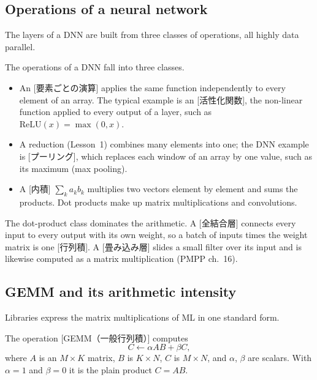 \documentclass[../main.tex]{subfiles}
\begin{document}
\subsection{Operations of a neural network}

The layers of a DNN are built from three classes of operations, all
highly data parallel.

\begin{definition}
  The operations of a DNN fall into three classes.
  \begin{itemize}
    \item An [要素ごとの演算] applies the
      same function independently to every element of an array.  The
      typical example is an [活性化関数], the
      non-linear function applied to every output of a layer, such as
      $\mathrm{ReLU}(x) = \max(0, x)$.
    \item A reduction (Lesson~1) combines many elements into one; the
      DNN example is [プーリング], which replaces each
      window of an array by one value, such as its maximum (max
      pooling).
    \item A [内積] $\sum_k a_k b_k$ multiplies two
      vectors element by element and sums the products.  Dot products
      make up matrix multiplications and convolutions.
  \end{itemize}
\end{definition}

The dot-product class dominates the arithmetic.  A
[全結合層] connects every input to every
output with its own weight, so a batch of inputs times the weight
matrix is one [行列積].  A
[畳み込み層] slides a small filter over its
input and is likewise computed as a matrix multiplication (PMPP
ch.~16).

\subsection{GEMM and its arithmetic intensity}

Libraries express the matrix multiplications of ML in one standard
form.

\begin{definition}[GEMM]
  The operation [GEMM（一般行列積）]
  computes
  \begin{equation}
    C \leftarrow \alpha A B + \beta C ,
    \label{eq:l12-gemm}
  \end{equation}
  where $A$ is an $M \times K$ matrix, $B$ is $K \times N$, $C$ is
  $M \times N$, and $\alpha$, $\beta$ are scalars.  With $\alpha = 1$ and
  $\beta = 0$ it is the plain product $C = AB$.
\end{definition}
\end{document}
